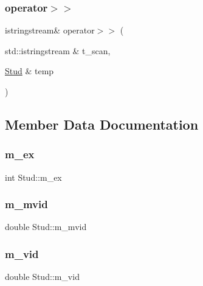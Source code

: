 \mbox{\label{class_stud_a71505fcbc6a3d59bd212b89b478962ce}} 
\subsubsection{\texorpdfstring{operator$>$$>$}{operator>>}}
{\footnotesize\ttfamily istringstream\& operator$>$$>$ (\begin{DoxyParamCaption}\item[{std\+::istringstream \&}]{t\+\_\+scan,  }\item[{\mbox{\hyperlink{class_stud}{Stud}} \&}]{temp }\end{DoxyParamCaption})\hspace{0.3cm}{\ttfamily [friend]}}



\subsection{Member Data Documentation}
\mbox{\label{class_stud_a5f52cca0a5786042eac89aba670c0bb7}} 
\subsubsection{\texorpdfstring{m\_ex}{m\_ex}}
{\footnotesize\ttfamily int Stud\+::m\+\_\+ex\hspace{0.3cm}{\ttfamily [private]}}

\mbox{\label{class_stud_a33421b12df3d9995f0e59f7ac21b262e}} 
\subsubsection{\texorpdfstring{m\_mvid}{m\_mvid}}
{\footnotesize\ttfamily double Stud\+::m\+\_\+mvid\hspace{0.3cm}{\ttfamily [private]}}

\mbox{\label{class_stud_af5365d950f39faf16533a67eeebb4c7a}} 
\subsubsection{\texorpdfstring{m\_vid}{m\_vid}}
{\footnotesize\ttfamily double Stud\+::m\+\_\+vid\hspace{0.3cm}{\ttfamily [private]}}



